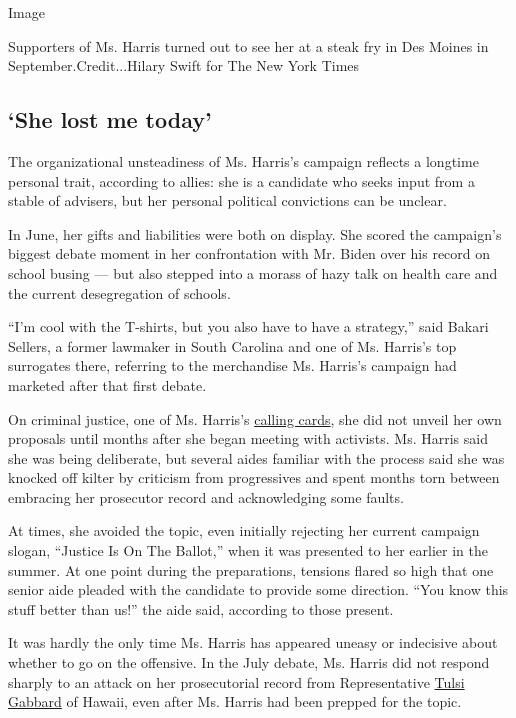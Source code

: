 Image

Supporters of Ms. Harris turned out to see her at a steak fry in Des
Moines in September.Credit...Hilary Swift for The New York Times

\hypertarget{she-lost-me-today}{%
\subsection{`She lost me today'}\label{she-lost-me-today}}

The organizational unsteadiness of Ms. Harris's campaign reflects a
longtime personal trait, according to allies: she is a candidate who
seeks input from a stable of advisers, but her personal political
convictions can be unclear.

In June, her gifts and liabilities were both on display. She scored the
campaign's biggest debate moment in her confrontation with Mr. Biden
over his record on school busing --- but also stepped into a morass of
hazy talk on health care and the current desegregation of schools.

``I'm cool with the T-shirts, but you also have to have a strategy,''
said Bakari Sellers, a former lawmaker in South Carolina and one of Ms.
Harris's top surrogates there, referring to the merchandise Ms. Harris's
campaign had marketed after that first debate.

On criminal justice, one of Ms. Harris's
\href{https://www.nytimes.com/2019/01/21/us/politics/kamala-harris-2020-president.html}{calling
cards}, she did not unveil her own proposals until months after she
began meeting with activists. Ms. Harris said she was being deliberate,
but several aides familiar with the process said she was knocked off
kilter by criticism from progressives and spent months torn between
embracing her prosecutor record and acknowledging some faults.

At times, she avoided the topic, even initially rejecting her current
campaign slogan, ``Justice Is On The Ballot,'' when it was presented to
her earlier in the summer. At one point during the preparations,
tensions flared so high that one senior aide pleaded with the candidate
to provide some direction. ``You know this stuff better than us!'' the
aide said, according to those present.

It was hardly the only time Ms. Harris has appeared uneasy or indecisive
about whether to go on the offensive. In the July debate, Ms. Harris did
not respond sharply to an attack on her prosecutorial record from
Representative
\href{https://www.nytimes.com/interactive/2020/us/elections/tulsi-gabbard.html}{Tulsi
Gabbard} of Hawaii, even after Ms. Harris had been prepped for the
topic.

